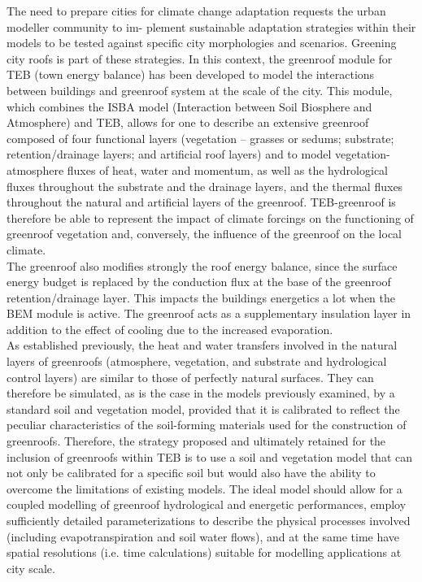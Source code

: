 The  need  to  prepare  cities  for  climate  change adaptation  requests  the  urban  modeller  community  to  im-
plement sustainable adaptation strategies within their models to be tested against specific city morphologies and scenarios. Greening city roofs is part of these strategies. In this context,  the  greenroof  module  for  TEB  (town  energy
balance)  has  been  developed  to  model  the  interactions  between buildings and greenroof system at the scale of the
city. This module, which combines the ISBA model (Interaction between Soil Biosphere and Atmosphere) and TEB,
allows for one to describe an extensive greenroof composed of  four  functional  layers  (vegetation  –  grasses  or  sedums;
substrate;  retention/drainage  layers;  and  artificial  roof  layers) and to model vegetation-atmosphere fluxes of heat, water and momentum, as well as the hydrological fluxes throughout  the  substrate  and  the  drainage  layers,  and  the  thermal fluxes throughout the natural and artificial layers of the greenroof. TEB-greenroof is therefore
be  able  to  represent  the  impact  of  climate  forcings  on  the functioning of greenroof vegetation and, conversely, the influence of the greenroof on the local climate. \\

The greenroof also modifies strongly the roof energy balance, since the surface energy budget is replaced by the conduction flux at the base of the greenroof retention/drainage layer. This impacts the buildings energetics a lot when the BEM module is active. The greenroof acts as a supplementary insulation layer in addition to the effect of cooling due to the increased evaporation. \\

As  established  previously,  the  heat  and  water  transfers  involved in the natural layers of greenroofs (atmosphere, vegetation, and substrate and hydrological control layers) are similar to those of perfectly natural surfaces. They can therefore be simulated, as is the case in the models previously examined, by a standard soil and vegetation model, provided that it is calibrated to reflect the peculiar characteristics of the soil-forming materials used for the construction of greenroofs.
Therefore, the strategy proposed and ultimately retained for the inclusion of greenroofs within TEB is to use a soil and vegetation model that can not only be calibrated for a specific  soil  but  would  also  have  the  ability  to  overcome  the limitations of existing models. The ideal model should allow for a coupled modelling of greenroof hydrological and energetic performances, employ sufficiently detailed parameterizations to describe the physical processes involved (including evapotranspiration and soil water flows), and at the same time have spatial resolutions (i.e. time calculations) suitable for modelling applications at city scale. \\


